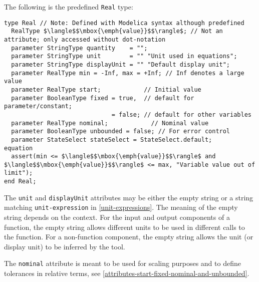 The following is the predefined \lstinline!Real! type:
\begin{lstlisting}[language=modelica]
type Real // Note: Defined with Modelica syntax although predefined
  RealType $\langle$$\mbox{\emph{value}}$$\rangle$; // Not an attribute; only accessed without dot-notation
  parameter StringType quantity    = "";
  parameter StringType unit        = "" "Unit used in equations";
  parameter StringType displayUnit = "" "Default display unit";
  parameter RealType min = -Inf, max = +Inf; // Inf denotes a large value
  parameter RealType start;            // Initial value
  parameter BooleanType fixed = true,  // default for parameter/constant;
                              = false; // default for other variables
  parameter RealType nominal;            // Nominal value
  parameter BooleanType unbounded = false; // For error control
  parameter StateSelect stateSelect = StateSelect.default;
equation
  assert(min <= $\langle$$\mbox{\emph{value}}$$\rangle$ and $\langle$$\mbox{\emph{value}}$$\rangle$ <= max, "Variable value out of limit");
end Real;
\end{lstlisting}%
%
%
%
%
%
%
%
%
%

The \lstinline!unit! and \lstinline!displayUnit! attributes may be either the empty string or a string matching \lstinline[language=grammar]!unit-expression! in \cref{unit-expressions}.
The meaning of the empty string depends on the context.
For the input and output components of a function, the empty string allows different units to be used in different calls to the function.
For a non-function component, the empty string allows the unit (or display unit) to be inferred by the tool.

The \lstinline!nominal! attribute is meant to be used for scaling purposes and to
define tolerances in relative terms, see \cref{attributes-start-fixed-nominal-and-unbounded}.

